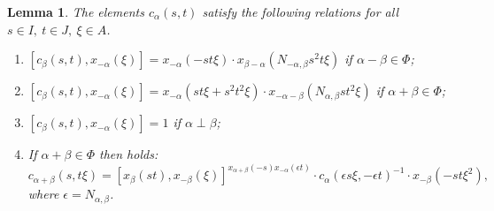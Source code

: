 \documentclass[oneside, 8pt]{amsart}
\newtheorem{lemma}{Lemma}
\theoremstyle{remark}
\theoremstyle{definition}
\numberwithin{equation}{section}
\begin{document}
\begin{lemma} \label{Crels}
The elements $c_\alpha(s, t)$ satisfy the following relations for all $s\in I,\ t\in J,\ \xi\in A$.
 \begin{enumerate}
  \item \label{C1} $[c_\beta(s, t), x_{-\alpha}(\xi)] = x_{-\alpha}(- st\xi) \cdot x_{\beta-\alpha}(N_{-\alpha,\beta}s^2t\xi)$ if $\alpha-\beta \in \Phi$;
  \item \label{C2} $[c_\beta(s, t), x_{-\alpha}(\xi)] = x_{-\alpha}(st\xi + s^2t^2\xi) \cdot x_{-\alpha-\beta}(N_{\alpha, \beta}st^2\xi)$ if $\alpha+\beta \in \Phi$;
  \item \label{C3} $[c_\beta(s, t), x_{-\alpha}(\xi)] = 1$ if $\alpha \perp \beta$;
  \item \label{C4} If $\alpha+\beta\in\Phi$ then holds:
  \[c_{\alpha+\beta}(s, t\xi) = [x_{\beta}(st), x_{-\beta}(\xi)] ^ {x_{\alpha+\beta}(-s) x_{-\alpha}(\epsilon t)} \cdot c_{\alpha}(\epsilon s\xi, -\epsilon t)^{-1} \cdot x_{-\beta}(-st\xi^2),\]
  where $\epsilon = N_{\alpha,\beta}$.
 \end{enumerate}
\end{lemma}
\end{document}
